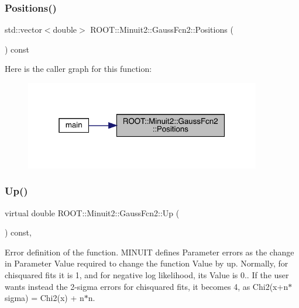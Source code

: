 \subsubsection{\texorpdfstring{Positions()}{Positions()}}
{\footnotesize\ttfamily std\+::vector$<$double$>$ R\+O\+O\+T\+::\+Minuit2\+::\+Gauss\+Fcn2\+::\+Positions (\begin{DoxyParamCaption}{ }\end{DoxyParamCaption}) const\hspace{0.3cm}{\ttfamily [inline]}}

Here is the caller graph for this function\+:\nopagebreak
\begin{figure}[H]
\begin{center}
\leavevmode
\includegraphics[width=292pt]{da/d5d/classROOT_1_1Minuit2_1_1GaussFcn2_a11faaa08de303ea203403c320c9e1f0a_icgraph}
\end{center}
\end{figure}
\mbox{\label{classROOT_1_1Minuit2_1_1GaussFcn2_aef7172f9af50244bc9fce0c96cc21e81}} 
\subsubsection{\texorpdfstring{Up()}{Up()}}
{\footnotesize\ttfamily virtual double R\+O\+O\+T\+::\+Minuit2\+::\+Gauss\+Fcn2\+::\+Up (\begin{DoxyParamCaption}{ }\end{DoxyParamCaption}) const\hspace{0.3cm}{\ttfamily [inline]}, {\ttfamily [virtual]}}

Error definition of the function. M\+I\+N\+U\+IT defines Parameter errors as the change in Parameter Value required to change the function Value by up. Normally, for chisquared fits it is 1, and for negative log likelihood, its Value is 0.. If the user wants instead the 2-\/sigma errors for chisquared fits, it becomes 4, as Chi2(x+n$\ast$sigma) = Chi2(x) + n$\ast$n.

